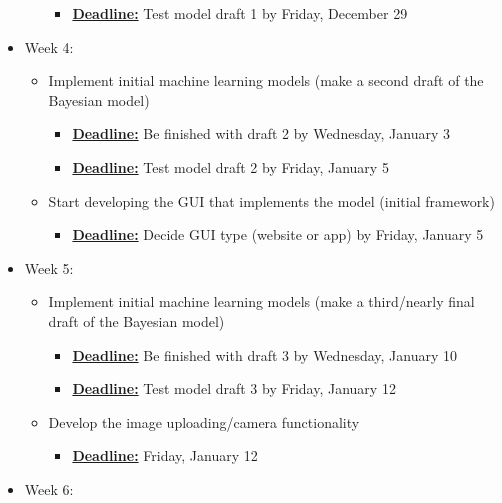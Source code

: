 \documentclass{notes}
\begin{document}
\begin{itemize}
\begin{itemize}
            \begin{itemize}
                \item \underline{\textbf{Deadline:}} Test model draft 1 by Friday, December 29
            \end{itemize}
        \end{itemize}
    \item Week 4:
        \begin{itemize}
            \item Implement initial machine learning models (make a second draft of the Bayesian model)
            \begin{itemize}
                \item \underline{\textbf{Deadline:}} Be finished with draft 2 by Wednesday, January 3
                \item \underline{\textbf{Deadline:}} Test model draft 2 by Friday, January 5
            \end{itemize}
            \item Start developing the GUI that implements the model (initial framework)
            \begin{itemize}
                \item \underline{\textbf{Deadline:}} Decide GUI type (website or app) by Friday, January 5
            \end{itemize}
        \end{itemize}
    \item Week 5:
        \begin{itemize}
            \item Implement initial machine learning models (make a third/nearly final draft of the Bayesian model)
            \begin{itemize}
                \item \underline{\textbf{Deadline:}} Be finished with draft 3 by Wednesday, January 10
                \item \underline{\textbf{Deadline:}} Test model draft 3 by Friday, January 12
            \end{itemize}
            \item Develop the image uploading/camera functionality
            \begin{itemize}
                \item \underline{\textbf{Deadline:}} Friday, January 12
            \end{itemize}
        \end{itemize}
    \item Week 6:

\end{itemize}
\end{document}

